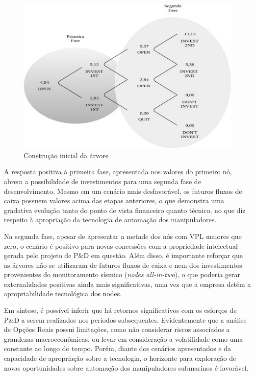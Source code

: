 \begin{figure}[h]
	\centering
	\includegraphics[width=.75\textwidth]{images/eco2.pdf}
	\caption{Construção inicial da árvore}
	\label{fig:eco2}
\end{figure}

A resposta positiva à primeira fase, apresentada nos valores do primeiro nó, abrem a possibilidade de investimentos para uma segunda fase de desenvolvimento. Mesmo em um cenário mais desfavorável, os futuros fluxos de caixa possuem valores acima das etapas anteriores, o que demonstra uma gradativa evolução tanto do ponto de vista financeiro quanto técnico, no que diz respeito à apropriação da tecnologia de automação dos manipuladores.

Na segunda fase, apesar de apresentar a metade dos nós com VPL maiores que zero, o cenário é positivo para novas concessões com a propriedade intelectual gerada pelo projeto de P\&D em questão. Além disso, é importante reforçar que as árvores não se utilizaram de futuros fluxos de caixa e nem dos investimentos provenientes do monitoramento sísmico (\textit{nodes all-in-two}), o que poderia gerar externalidades positivas ainda mais significativas, uma vez que a empresa detém a apropriabilidade tecnológica dos nodes. 

Em síntese, é possível inferir que há retornos significativos com os esforços de P\&D a serem realizados nos períodos subsequentes. Evidentemente que a análise de Opções Reais possui limitações, como não considerar riscos associados a grandezas macroeconômicas, ou levar em consideração a volatilidade como uma constante ao longo do tempo. Porém, diante dos cenários apresentados e da capacidade de apropriação sobre a tecnologia, o horizonte para exploração de novas oportunidades sobre automação dos manipuladores submarinos é favorável.


